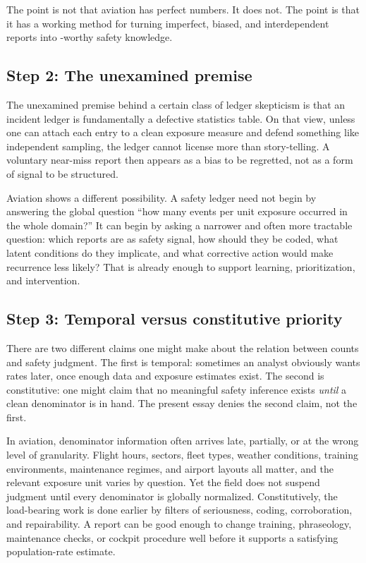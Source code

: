 \documentclass[11pt]{article}
\begin{document}
The point is not that aviation has perfect numbers. It does not. The point is that it has a working method for turning imperfect, biased, and interdependent reports into \continuation-worthy safety knowledge.

\subsection{Step 2: The unexamined premise}
The unexamined premise behind a certain class of ledger skepticism is that an incident ledger is fundamentally a defective statistics table. On that view, unless one can attach each entry to a clean exposure measure and defend something like independent sampling, the ledger cannot license more than story-telling. A voluntary near-miss report then appears as a bias to be regretted, not as a form of signal to be structured.

Aviation shows a different possibility. A safety ledger need not begin by answering the global question ``how many events per unit exposure occurred in the whole domain?'' It can begin by asking a narrower and often more tractable question: which reports are \admissible as safety signal, how should they be coded, what latent conditions do they implicate, and what corrective action would make recurrence less likely? That is already enough to support learning, prioritization, and intervention.

\subsection{Step 3: Temporal versus constitutive priority}
There are two different claims one might make about the relation between counts and safety judgment. The first is temporal: sometimes an analyst obviously wants rates later, once enough data and exposure estimates exist. The second is constitutive: one might claim that no meaningful safety inference exists \emph{until} a clean denominator is in hand. The present essay denies the second claim, not the first.

In aviation, denominator information often arrives late, partially, or at the wrong level of granularity. Flight hours, sectors, fleet types, weather conditions, training environments, maintenance regimes, and airport layouts all matter, and the relevant exposure unit varies by question. Yet the field does not suspend judgment until every denominator is globally normalized. Constitutively, the load-bearing work is done earlier by filters of seriousness, coding, corroboration, and repairability. A report can be good enough to change training, phraseology, maintenance checks, or cockpit procedure well before it supports a satisfying population-rate estimate.
\end{document}
